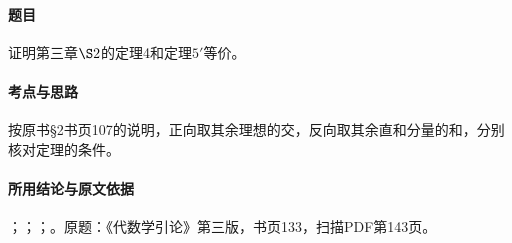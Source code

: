 \label{ex:3:24}

\paragraph{题目}

证明第三章$\S2$的定理4和定理$5'$等价。

\paragraph{考点与思路}

按原书§2书页107的说明，正向取其余理想的交，反向取其余直和分量的和，分别核对定理的条件。

\paragraph{所用结论与原文依据}

；；；。原题：《代数学引论》第三版，书页133，扫描PDF第143页。


